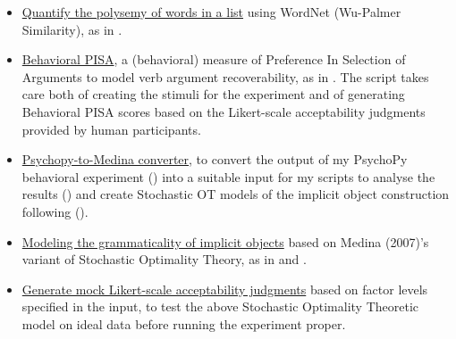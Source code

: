 \begin{itemize}    
    \item \href{https://github.com/giuliacappelli/checkPolysemy}{Quantify the polysemy of words in a list} using WordNet (Wu-Palmer Similarity), as in .
    \item \href{https://github.com/giuliacappelli/behavioralPISA}{Behavioral PISA}, a (behavioral) measure of Preference In Selection of Arguments to model verb argument recoverability, as in . The script takes care both of creating the stimuli for the experiment and of generating Behavioral PISA scores based on the Likert-scale acceptability judgments provided by human participants.
    \item \href{https://github.com/giuliacappelli/PsychopyToMedina}{Psychopy-to-Medina converter}, to convert the output of my PsychoPy behavioral experiment () into a suitable input for my scripts to analyse the results () and create Stochastic OT models of the implicit object construction following \textcite{Medina2007} ().
    \item \href{https://github.com/giuliacappelli/MedinaStochasticOptimalityTheory}{Modeling the grammaticality of implicit objects} based on Medina (2007)'s variant of Stochastic Optimality Theory, as in  and .
    \item \href{https://github.com/giuliacappelli/generateMockLikertGrammaticalityJudgments}{Generate mock Likert-scale acceptability judgments} based on factor levels specified in the input, to test the above Stochastic Optimality Theoretic model on ideal data before running the experiment proper.
\end{itemize}


